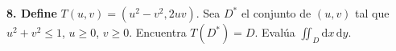 \textbf{8. Define} \(T(u,v) = (u^2 - v^2, 2uv)\). Sea \(D^*\) el conjunto de \((u,v)\) tal que \(u^2 + v^2 \leq 1\), \(u \geq 0\), \(v \geq 0\). Encuentra \(T(D^*) = D\). Evalúa \(\iint_D \mathrm{d}x \, \mathrm{d}y\).
